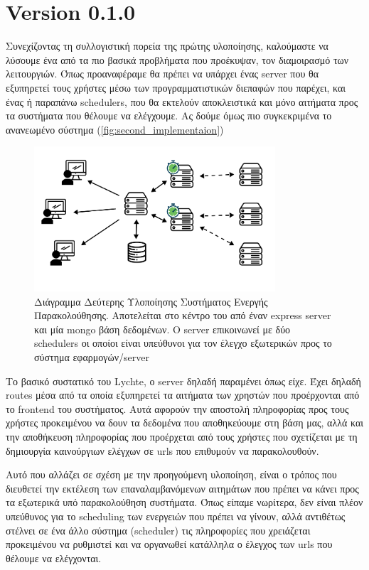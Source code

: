 \newpage

\section{Version 0.1.0}
\label{section:second_implementation}

Συνεχίζοντας τη συλλογιστική πορεία της πρώτης υλοποίησης, καλούμαστε να λύσουμε ένα από τα πιο βασικά προβλήματα που προέκυψαν,
τον διαμοιρασμό των λειτουργιών. Όπως προαναφέραμε θα πρέπει να υπάρχει ένας server που θα εξυπηρετεί
τους χρήστες μέσω των προγραμματιστικών διεπαφών που παρέχει, και ένας ή παραπάνω schedulers, που θα εκτελούν
αποκλειστικά και μόνο αιτήματα προς τα συστήματα που θέλουμε να ελέγχουμε. Ας δούμε όμως πιο συγκεκριμένα το ανανεωμένο σύστημα (\autoref{fig:second_implementaion})

\begin{figure}[!ht]
	\centering
	\includegraphics[width=0.8\textwidth]{./images/chapter4/lychte-second-implementation.png}
	\caption[Διάγραμμα δεύτερης Υλοποίησης]{Διάγραμμα Δεύτερης Υλοποίησης Συστήματος Ενεργής Παρακολούθησης. Αποτελείται στο κέντρο του από έναν express server και μία mongo βάση δεδομένων. Ο server επικοινωνεί με δύο schedulers οι οποίοι είναι υπεύθυνοι για τον έλεγχο εξωτερικών προς το σύστημα εφαρμογών/server}
	\label{fig:second_implementaion}
\end{figure}

Το βασικό συστατικό του Lychte, ο server δηλαδή παραμένει όπως είχε. Έχει δηλαδή routes μέσα από τα οποία εξυπηρετεί τα αιτήματα
των χρηστών που προέρχονται από το frontend του συστήματος. Αυτά αφορούν την αποστολή πληροφορίας προς τους χρήστες προκειμένου να δουν
τα δεδομένα που αποθηκεύουμε στη βάση μας, αλλά και την αποθήκευση πληροφορίας που προέρχεται από τους χρήστες που σχετίζεται με τη δημιουργία
καινούργιων ελέγχων σε urls που επιθυμούν να παρακολουθούν.

Αυτό που αλλάζει σε σχέση με την προηγούμενη υλοποίηση, είναι ο τρόπος που διευθετεί
την εκτέλεση των επαναλαμβανόμενων αιτημάτων που πρέπει να κάνει προς τα εξωτερικά υπό παρακολούθηση συστήματα.
Όπως είπαμε νωρίτερα, δεν είναι πλέον υπεύθυνος για το scheduling των ενεργειών που πρέπει να γίνουν,
αλλά αντιθέτως στέλνει σε ένα άλλο σύστημα (scheduler) τις πληροφορίες που χρειάζεται προκειμένου να ρυθμιστεί και να οργανωθεί κατάλληλα
ο έλεγχος των urls που θέλουμε να ελέγχονται.

